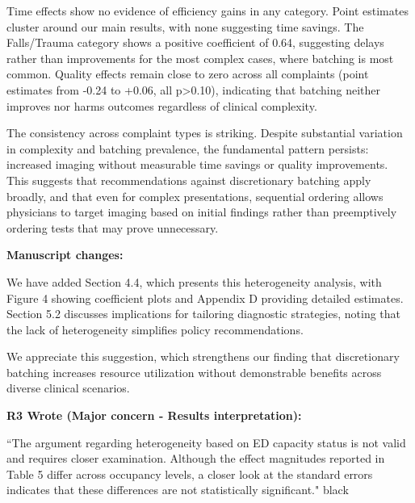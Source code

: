 \documentclass[11pt]{article}
\newenvironment{quote2}
{ \bigskip
\noindent
         \small\em
         \baselineskip=14pt
}
\newcommand{\1}{\hbox{\rm 1\kern-.35em 1}}
\begin{document}
Time effects show no evidence of efficiency gains in any category. Point estimates cluster around our main results, with none suggesting time savings. The Falls/Trauma category shows a positive coefficient of 0.64, suggesting delays rather than improvements for the most complex cases, where batching is most common. Quality effects remain close to zero across all complaints (point estimates from -0.24 to +0.06, all p>0.10), indicating that batching neither improves nor harms outcomes regardless of clinical complexity.

The consistency across complaint types is striking. Despite substantial variation in complexity and batching prevalence, the fundamental pattern persists: increased imaging without measurable time savings or quality improvements. This suggests that recommendations against discretionary batching apply broadly, and that even for complex presentations, sequential ordering allows physicians to target imaging based on initial findings rather than preemptively ordering tests that may prove unnecessary.

\textbf{Manuscript changes:}

We have added Section 4.4, which presents this heterogeneity analysis, with Figure 4 showing coefficient plots and Appendix D providing detailed estimates. Section 5.2 discusses implications for tailoring diagnostic strategies, noting that the lack of heterogeneity simplifies policy recommendations.

We appreciate this suggestion, which strengthens our finding that discretionary batching increases resource utilization without demonstrable benefits across diverse clinical scenarios.
\color{black}

\begin{quote2}
\textbf{R3 Wrote (Major concern -  Results interpretation):}  

\noindent``The argument regarding heterogeneity based on ED capacity status is not valid and requires closer examination. Although the effect magnitudes reported in Table 5 differ across occupancy levels, a closer look at the standard errors indicates that these differences are not statistically significant."
\end{quote2}

[PLACEHOLDER WANT TO TALK TO SOROUSH BEFORE I WRITE]

\color{black}
\end{document}
